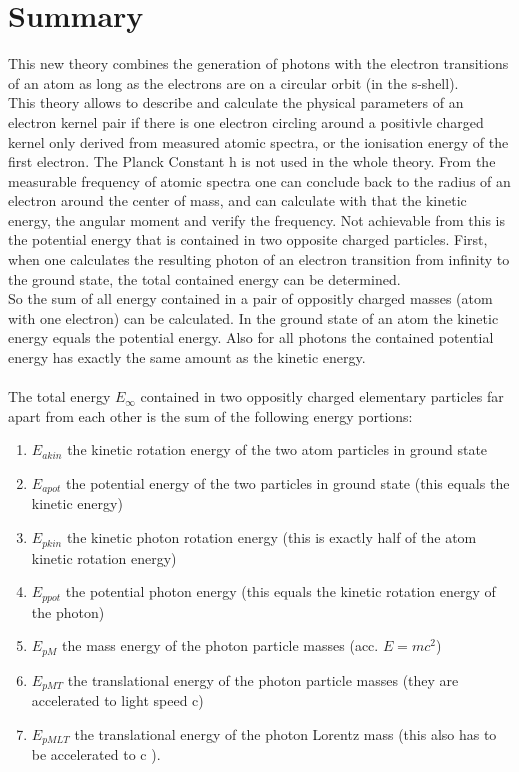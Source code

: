 \documentclass[10pt,titlepage]{article}
\begin{document}
\section{Summary}
This new theory combines the generation of photons with the electron transitions of an atom as long as the electrons are on a circular orbit (in the s-shell).
\\This theory allows to describe and calculate the physical parameters of an electron kernel pair if there is one electron circling around a positivle charged kernel only derived from measured  atomic spectra, or the ionisation energy of the first electron. The Planck Constant h is not used in the whole theory. From the measurable frequency of atomic spectra one can conclude back to the radius of an electron around the center of mass, and can calculate with that the kinetic energy, the angular moment  and verify the frequency. Not achievable from this is the potential energy that is contained in two opposite charged particles. First, when one calculates the resulting photon of an electron transition from infinity to the ground state, the total contained energy can be determined. 
\\
So the sum of all energy contained in a pair of oppositly charged masses (atom with one electron) can be calculated.
In the ground state of an atom the kinetic energy equals the potential energy. Also for all photons the contained potential energy has exactly the same amount as the kinetic energy.
\\\\
The total energy  $E_{\infty}$ contained in two oppositly charged elementary particles far apart from each other is the sum of the following energy portions:
\begin{enumerate}
	\item $E_{akin}$ the kinetic rotation energy of the two atom particles in ground state
	\item $E_{apot}$ the potential energy of the two particles in ground state (this equals the kinetic energy)
	\item $E_{pkin}$ the kinetic photon rotation energy (this is exactly half of the atom kinetic rotation energy)
	\item $E_{ppot}$ the potential photon energy (this equals the kinetic rotation energy of the photon)
	\item $E_{pM}$ the mass energy of the photon particle masses (acc. $E=m c^2$)
	\item $E_{pMT}$ the translational energy of the photon particle masses (they are accelerated to light speed c)
	\item $E_{pMLT}$ the translational energy of the photon Lorentz mass (this also has to be accelerated to c ). 
\end{enumerate}
\end{document}
